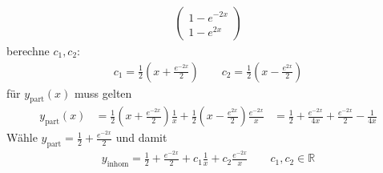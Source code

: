 \begin{example}
\begin{enum-arab}
\begin{align*}
\begin{pmatrix}
        1 - e^{-2x} \\ 1 - e^{2x}
      \end{pmatrix}
    \end{align*}
    berechne $c_1, c_2$:
    \begin{align*}
      c_1 = \frac 12 (x + \tfrac {e^{-2x}}2)
      \qquad
      c_2 = \frac 12 (x - \tfrac {e^{2x}}2)
    \end{align*}
    für $y_{\text{part}} (x)$ muss gelten
    \begin{align*}
      y_{\text{part}} (x) &= \frac 12 (x + \tfrac{e^{-2x}}2)\frac 1x + \frac 12 (x - \tfrac {e^{2x}}2) \frac {e^{-2x}}x
      &= \frac 12 + \frac {e^{-2x}}{4x} + \frac {e^{-2x}}2 - \frac 1{4x}
    \end{align*}
    Wähle $y_{\text{part}} = \frac 12 + \frac {e^{-2x}}2$ und damit
    \begin{align*}
      y_{\text{inhom}} = \frac 12 + \frac {e^{-2x}}2 + c_1 \frac 1x + c_2 \frac {e^{-2x}}x
      \qquad
      c_1, c_2 \in \mathbb{R}
    \end{align*}
  \end{enum-arab}
\end{example}


